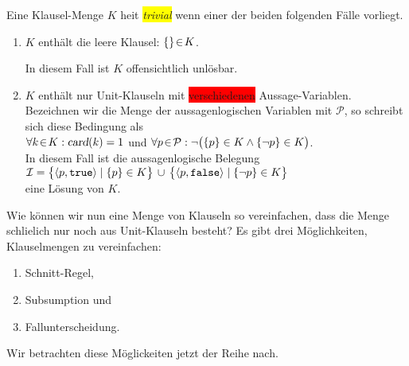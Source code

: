 \begin{Definition}
  Eine Klausel-Menge $K$ hei\3t \colorbox{yellow}{\emph{trivial}} wenn einer der beiden folgenden F\"{a}lle
  vorliegt.
  \begin{enumerate}
  \item $K$ enth\"{a}lt die leere Klausel: \qquad $\{\} \!\in\! K$.

        In diesem Fall ist $K$ offensichtlich unl\"{o}sbar.
  \item $K$ enth\"{a}lt nur Unit-Klauseln mit \colorbox{red}{verschiedenen} Aussage-Variablen.
        Bezeichnen wir die Menge der aussagenlogischen Variablen mit $\mathcal{P}$,
        so schreibt sich diese Bedingung als 
        \\[0.3cm]
        \hspace*{1.3cm}
        $\forall k \!\in\! K: \textsl{card}(k) = 1$ \quad und \quad
        $\forall p \!\in\! \mathcal{P}: \neg\bigl( \{p\} \in K \wedge \{\neg p\} \in K\bigr)$.
        \\[0.3cm]
        In diesem Fall ist die aussagenlogische Belegung
        \\[0.2cm]
        \hspace*{1.3cm}
        $ \I = \bigl\{ \pair(p, \mathtt{true}) \mid \{p\} \in K \bigr\} \,\cup\, \bigl\{
             \pair(p, \mathtt{false}) \mid \{\neg p\} \in K \bigr\} 
        $
        \\[0.2cm]
        eine L\"{o}sung von $K$. \eox
  \end{enumerate}
\end{Definition}


Wie k\"{o}nnen wir nun eine Menge von Klauseln so vereinfachen, dass die Menge schlie\3lich nur
noch aus Unit-Klauseln besteht?  Es gibt drei
M\"{o}glichkeiten, Klauselmengen zu vereinfachen:
\begin{enumerate}
\item Schnitt-Regel,
\item Subsumption und
\item Fallunterscheidung.
\end{enumerate}
Wir betrachten diese M\"{o}glickeiten jetzt der Reihe nach.

